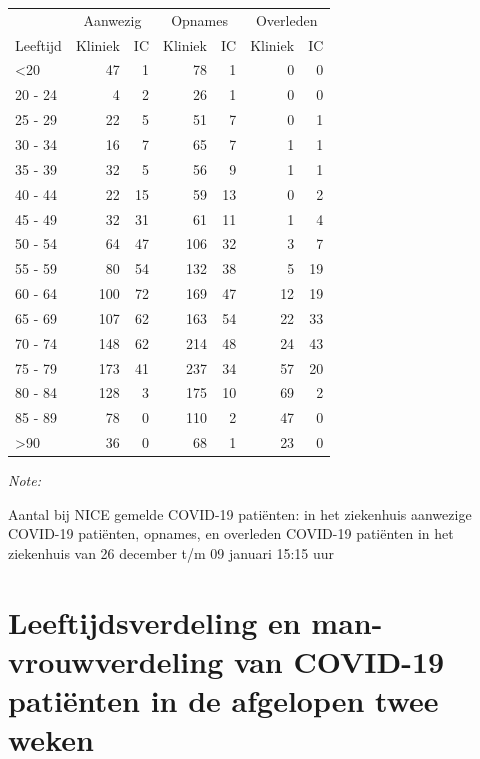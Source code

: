 \documentclass[
  english,
  man,floatsintext]{apa6}
\begin{document}
\begin{table}
\centering\begingroup\fontsize{10}{12}\selectfont

\begin{threeparttable}
\begin{tabular}{lrrrrrr}
\toprule
\multicolumn{1}{c}{ } & \multicolumn{2}{c}{Aanwezig} & \multicolumn{2}{c}{Opnames} & \multicolumn{2}{c}{Overleden} \\
\cmidrule(l{3pt}r{3pt}){2-3} \cmidrule(l{3pt}r{3pt}){4-5} \cmidrule(l{3pt}r{3pt}){6-7}
Leeftijd & Kliniek & IC & Kliniek & IC & Kliniek & IC\\
\midrule
<20 & 47 & 1 & 78 & 1 & 0 & 0\\
20 - 24 & 4 & 2 & 26 & 1 & 0 & 0\\
25 - 29 & 22 & 5 & 51 & 7 & 0 & 1\\
30 - 34 & 16 & 7 & 65 & 7 & 1 & 1\\
35 - 39 & 32 & 5 & 56 & 9 & 1 & 1\\
40 - 44 & 22 & 15 & 59 & 13 & 0 & 2\\
45 - 49 & 32 & 31 & 61 & 11 & 1 & 4\\
50 - 54 & 64 & 47 & 106 & 32 & 3 & 7\\
55 - 59 & 80 & 54 & 132 & 38 & 5 & 19\\
60 - 64 & 100 & 72 & 169 & 47 & 12 & 19\\
65 - 69 & 107 & 62 & 163 & 54 & 22 & 33\\
70 - 74 & 148 & 62 & 214 & 48 & 24 & 43\\
75 - 79 & 173 & 41 & 237 & 34 & 57 & 20\\
80 - 84 & 128 & 3 & 175 & 10 & 69 & 2\\
85 - 89 & 78 & 0 & 110 & 2 & 47 & 0\\
>90 & 36 & 0 & 68 & 1 & 23 & 0\\
\bottomrule
\end{tabular}
\begin{tablenotes}
\item \textit{Note: } 
\item Aantal bij NICE gemelde COVID-19 patiënten: in het ziekenhuis aanwezige COVID-19 patiënten, opnames, en overleden COVID-19 patiënten in het ziekenhuis van 26 december t/m 09 januari 15:15 uur
\end{tablenotes}
\end{threeparttable}
\endgroup{}
\end{table}

\newpage

\hypertarget{leeftijdsverdeling-en-man-vrouwverdeling-van-covid-19-patiuxebnten-in-de-afgelopen-twee-weken}{%
\section{Leeftijdsverdeling en man-vrouwverdeling van COVID-19 patiënten in de afgelopen twee weken}\label{leeftijdsverdeling-en-man-vrouwverdeling-van-covid-19-patiuxebnten-in-de-afgelopen-twee-weken}}
\end{document}

